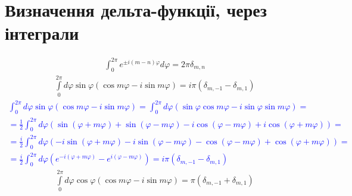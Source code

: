 \section{Визначення дельта-функції, через інтеграли}
%
\begin{equation} \begin{aligned} \label{eq:int_exp0}
\int_{0}^{2\pi} e^{\pm i (m-n) \varphi} d \varphi = 2 \pi \delta_{m,n} 
\end{aligned} \end{equation}
%
\begin{equation} \begin{aligned} \label{eq:int_exp1}
\int \limits_{0}^{2\pi} d \varphi \sin \varphi 
\left( \cos m \varphi - i \sin m \varphi \right) = 
i \pi \left( \delta_{m,-1} - \delta_{m,1} \right)
\end{aligned} \end{equation}
%
\textcolor{blue}{ \begin{equation*} \begin{aligned}
\int_{0}^{2\pi} d \varphi \sin \varphi 
\left( \cos m \varphi - i \sin m \varphi \right) = \int_{0}^{2\pi} d \varphi
\left( \sin \varphi \cos m \varphi - i \sin \varphi \sin m \varphi \right) = \\
= \frac{1}{2} \int_{0}^{2\pi} d \varphi \left( \sin (\varphi + m \varphi) + 
\sin (\varphi - m \varphi) - i \cos (\varphi - m \varphi) + 
i \cos (\varphi + m \varphi) \right) = \\
= \frac{i}{2} \int_{0}^{2\pi} d \varphi \left( -i \sin (\varphi + m \varphi) -
i \sin (\varphi - m \varphi) - \cos (\varphi - m \varphi) + 
\cos (\varphi + m \varphi) \right) = \\
= \frac{i}{2} \int_{0}^{2\pi} d \varphi \left( e^{-i (\varphi + m \varphi)} - 
e^{i (\varphi - m \varphi)} \right) = 
i \pi \left( \delta_{m,-1} - \delta_{m,1} \right)
\end{aligned} \end{equation*} }
%
\begin{equation} \begin{aligned} \label{eq:int_exp2}
\int \limits_{0}^{2\pi} d \varphi \cos \varphi 
( \cos m \varphi - i \sin m \varphi) = \pi ( \delta_{m,-1} + \delta_{m,1} )
\end{aligned} \end{equation}
%
